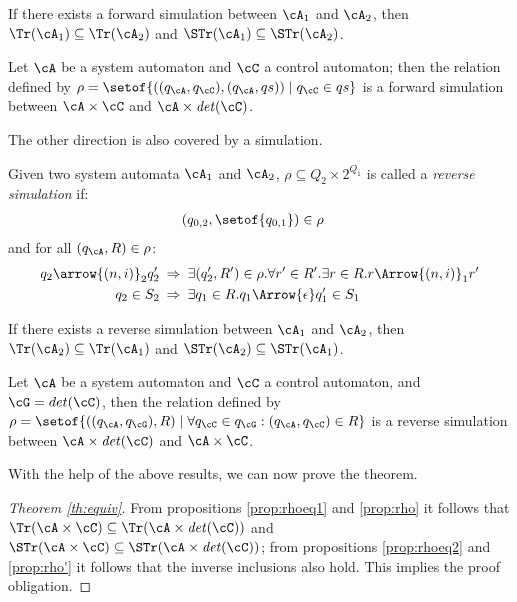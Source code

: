 \begin{proposition}\label{prop:rhoeq1}
If there exists a forward simulation between $\cA_1$ and $\cA_2$, then $\Tr(\cA_1) \subseteq \Tr(\cA_2)$ and $\STr(\cA_1) \subseteq \STr(\cA_2)$.
\end{proposition}

\begin{proposition}\label{prop:rho}
Let $\cA$ be a system automaton and $\cC$ a control automaton; then the relation defined by $\rho = \setof{((q_\cA,q_\cC),(q_\cA,qs)) \mid q_\cC \in qs}$ is a forward simulation between $\cA \times \cC$ and $\cA \times \mathit{det}(\cC)$.
\end{proposition}

The other direction is also covered by a simulation.

\begin{definition}\label{def:rho'}
Given two system automata $\cA_1$ and $\cA_2$, $\rho \subseteq Q_2 \times 2^{Q_1}$ is called a \emph{reverse simulation} if:
\begin{align}\label{sim4}
&(q_{0,2}, \setof{q_{0,1}}) \in \rho &
\end{align}
and for all $(q_{\cA}, R) \in \rho$:
\begin{align}\label{sim5}
q_2 \arrow{(n,i)}_2 q_2' \: &\Rightarrow \: \exists (q_2', R') \in \rho.\forall r' \in R'. \exists r \in R.r \Arrow{(n,i)}_1 r'\\
\label{sim6}
q_2 \in S_2 \: &\Rightarrow \: \exists q_1 \in R. q_1 \Arrow{\epsilon} q_1' \in S_1
\end{align}
\end{definition}

\begin{proposition}\label{prop:rhoeq2}
If there exists a reverse simulation between $\cA_1$ and $\cA_2$, then $\Tr(\cA_2) \subseteq \Tr(\cA_1)$ and $\STr(\cA_2) \subseteq \STr(\cA_1)$.
\end{proposition}

\begin{proposition}\label{prop:rho'}
Let $\cA$ be a system automaton and $\cC$ a control automaton, and $\cG = det(\cC)$, then the relation defined by $\rho = \setof{ ((q_\cA,q_\cG),R) \mid \forall q_\cC \in q_\cG: (q_\cA,q_\cC) \in R}$ is a reverse simulation between $\cA \times \mathit{det}(\cC)$ and $\cA \times \cC$.
\end{proposition}
%
With the help of the above results, we can now prove the theorem.

\begin{proof}[Theorem \ref{th:equiv}]
From propositions \ref{prop:rhoeq1} and \ref{prop:rho} it follows that $\Tr(\cA \times \cC) \subseteq \Tr(\cA \times \mathit{det}(\cC))$ and $\STr(\cA \times \cC) \subseteq \STr(\cA \times \mathit{det}(\cC))$; from propositions \ref{prop:rhoeq2} and \ref{prop:rho'} it follows that the inverse inclusions also hold. This implies the proof obligation.
\end{proof}
